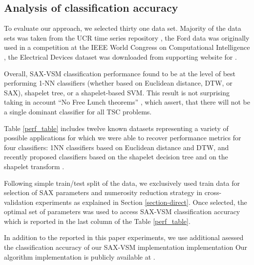 \documentclass{llncs}
\begin{document}
\subsection{Analysis of classification accuracy}
To evaluate our approach, we selected thirty one data set. Majority of the data sets was taken 
from the UCR time series repository \cite{ucr}, the Ford data was originally used in a competition
at the IEEE World Congress on Computational Intelligence \cite{ford}, the Electrical Devices
dataset was downloaded from supporting website for \cite{bagnal}.

Overall, SAX-VSM classification performance found to be at the level of best
performing 1-NN classifiers (whether based on Euclidean distance, DTW, or SAX), shapelet tree, or a
shapelet-based SVM. This result is not surprising taking in account ``No Free Lunch theorems''
\cite{nfl}, which assert, that there will not be a single dominant classifier for all TSC problems.

Table \ref{perf_table} includes twelve known datasets representing a variety of possible 
applications for which we were able to recover performance metrics for four classifiers:
1NN classifiers based on Euclidean distance and DTW, and recently proposed classifiers 
based on the shapelet decision tree \cite{shapelet} \cite{logical} and on the 
shapelet transform \cite{bagnal}. 

Following simple train/test split of the data, we exclusively used train data for selection
of SAX parameters and numerosity reduction strategy in cross-validation experiments as 
explained in Section \ref{section-direct}. Once selected, the optimal set of parameters 
was used to access SAX-VSM classification accuracy which is reported in the last column 
of the Table \ref{perf_table}.

In addition to the reported in this paper experiments, we use additional asessed the classification accuracy 
of our SAX-VSM implementation implementation 
Our algorithm implementation is publicly available at \cite{jmotif}.
\end{document}
